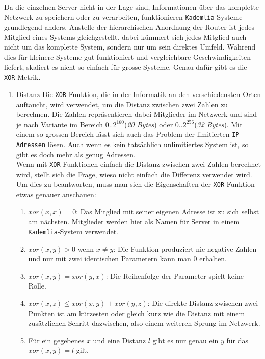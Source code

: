 \documentclass[a4paper,11pt,titlepage,twoside]{memoir}
\begin{document}
\noindent Da die einzelnen Server nicht in der Lage sind,
Informationen über das komplette Netzwerk zu speichern oder zu
verarbeiten, funktionieren \texttt{Kademlia}-Systeme grundlegend anders.
Anstelle der hierarchischen Anordnung der Router ist jedes Mitglied
eines Systems gleichgestellt. dabei kümmert sich jedes Mitglied auch
nicht um das komplette System, sondern nur um sein direktes Umfeld.
Während dies für kleinere Systeme gut funktioniert und vergleichbare
Geschwindigkeiten liefert, skaliert es nicht so einfach für grosse
Systeme. Genau dafür gibt es die \texttt{XOR}-Metrik.
\begin{enumerate}
\item Distanz
\label{sec:org58d2077}
Die \texttt{XOR}-Funktion, die in der Informatik an den verschiedensten
Orten auftaucht, wird verwendet, um die Distanz zwischen zwei
Zahlen zu berechnen. Die Zahlen repräsentieren dabei Mitglieder
im Netzwerk und sind je nach Variante im Bereich
\(0..2^{160}\)(\emph{20 Bytes}) oder \(0..2^{256}\)(\emph{32 Bytes}). Mit einem
so grossen Bereich lässt sich auch das Problem der limitierten
\texttt{IP-Adressen} lösen. Auch wenn es kein tatsächlich unlimitiertes
System ist, so gibt es doch mehr als genug Adressen.\\

\noindent Wenn mit \texttt{XOR}-Funktionen einfach die Distanz zwischen
zwei Zahlen berechnet wird, stellt sich die Frage, wieso nicht
einfach die Differenz verwendet wird. Um dies zu beantworten,
muss man sich die Eigenschaften der \texttt{XOR}-Funktion etwas genauer
anschauen:

\begin{enumerate}
\item \(xor(x, x) = 0\): Das Mitglied mit seiner eigenen Adresse ist
zu sich selbst am nächsten. Mitglieder werden hier als Namen
für Server in einem \texttt{Kademlia}-System verwendet.
\item \(xor(x, y) > 0\) wenn \(x \neq y\): Die Funktion produziert nie
negative Zahlen und nur mit zwei identischen Parametern kann
man \(0\) erhalten.
\item \(xor(x, y) = xor(y, x)\): Die Reihenfolge der Parameter spielt
keine Rolle.
\item \(xor(x, z) \leq xor(x, y) + xor(y, z)\): Die direkte Distanz
zwischen zwei Punkten ist am kürzesten oder gleich kurz wie
die Distanz mit einem zusätzlichen Schritt dazwischen, also
einem weiteren Sprung im Netzwerk.
\item Für ein gegebenes \(x\) und eine Distanz \(l\) gibt es nur
genau ein \(y\) für das \(xor(x, y) = l\) gilt.
\end{enumerate}


\end{enumerate}
\end{document}
